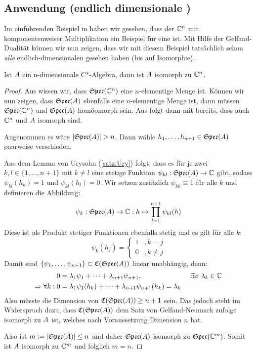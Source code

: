 \subsection{Anwendung (endlich dimensionale \CAlgn)}\label{sec:Anwendung}

Im einführenden Beispiel in  haben wir gesehen, dass der $\mathbb{C}^n$ mit komponentenweiser Multiplikation ein Beispiel für eine \CAlg{} ist. Mit Hilfe der Gelfand-Dualität können wir nun zeigen, dass wir mit diesem Beispiel tatsächlich schon \emph{alle} endlich-dimensionalen \CAlgn{} gesehen haben (bis auf Isomorphie).

\begin{lemma}
Ist $A$ ein n-dimensionale C*-Algebra, dann ist $A$ isomorph zu $\mathbb{C}^n$.
\end{lemma}

\begin{proof}Aus  wissen wir, dass $\mathfrak{Spec}(\mathbb{C}^n)$ eine $n$-elementige Menge ist. Können wir nun zeigen, dass $\mathfrak{Spec}(A)$ ebenfalls eine $n$-elementige Menge ist, dann müssen $\mathfrak{Spec}(\mathbb{C}^n)$ und $\mathfrak{Spec}(A)$ homöomorph sein. Aus  folgt dann mit  bereits, dass auch $\mathbb{C}^n$ und $A$ isomorph sind.

Angenommen es wäre $|\mathfrak{Spec}(A)| > n$. Dann wähle $h_1, \dots, h_{n+1} \in \mathfrak{Spec}(A)$ paarweise verschieden. 

Aus dem Lemma von Urysohn (\ref{satz:Ury}) folgt, dass es für je zwei $k, l \in \{1, \dots, n+1\}$ mit $k \neq l$ eine stetige Funktion $\psi_{kl}: \mathfrak{Spec}(A) \to \mathbb{C}$ gibt, sodass $\psi_{kl}(h_k) = 1$ und $\psi_{kl}(h_l) = 0$. Wir setzen zusätzlich $\psi_{kk} \equiv 1$ für alle $k$ und definieren die Abbildung:
	\[\psi_k: \mathfrak{Spec}(A) \to \mathbb{C}: h \mapsto \prod_{l=1}^{n+1}\psi_{kl}(h)\]
Diese ist als Produkt stetiger Funktionen ebenfalls stetig und es gilt für alle $k$:
	\[\psi_k(h_j) = \begin{cases} 1 &, k=j \\ 0 &, k\neq j \end{cases}\]
Damit sind $\{\psi_1, \dots, \psi_{n+1}\} \subset \mathfrak{C}(\mathfrak{Spec}(A))$ linear unabhängig, denn:
	\begin{align*}
							 0 &= \lambda_1\psi_1 + \dots + \lambda_{n+1}\psi_{n+1}, &\text{ für } \lambda_k \in \mathbb{C} \\
	\Rightarrow \forall k:   0 &= \lambda_1\psi_1(h_k) + \dots + \lambda_{n+1}\psi_{n+1}(h_k) = \lambda_k &
	\end{align*}
Also müsste die Dimension von $\mathfrak{C}(\mathfrak{Spec}(A)) \geq n+1$ sein. Das jedoch steht im Widerspruch dazu, dass $\mathfrak{C}(\mathfrak{Spec}(A))$ dem Satz von Gelfand-Neumark zufolge isomorph zu $A$ ist, welches nach Voraussetzung Dimension $n$ hat.

Also ist $m := |\mathfrak{Spec}(A)| \leq n$ und daher $\mathfrak{Spec}(A)$ isomorph zu $\mathfrak{Spec}(\mathbb{C}^m)$. Somit ist $A$ isomorph zu $\mathbb{C}^m$ und folglich $m = n$.
\end{proof}